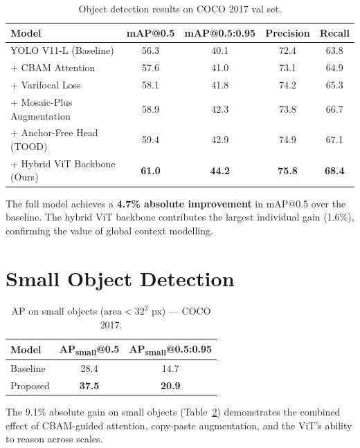 \documentclass[12pt, a4paper]{report}
\begin{document}
\begin{table}[H]
  \centering
  \caption{Object detection results on COCO 2017 val set.}
  \label{tab:coco-results}
  \begin{tabular}{lcccc}
    \toprule
    \textbf{Model} & \textbf{mAP@0.5} & \textbf{mAP@0.5:0.95} 
                   & \textbf{Precision} & \textbf{Recall} \\
    \midrule
    YOLO V11-L (Baseline)         & 56.3 & 40.1 & 72.4 & 63.8 \\
    + CBAM Attention               & 57.6 & 41.0 & 73.1 & 64.9 \\
    + Varifocal Loss               & 58.1 & 41.8 & 74.2 & 65.3 \\
    + Mosaic-Plus Augmentation     & 58.9 & 42.3 & 73.8 & 66.7 \\
    + Anchor-Free Head (TOOD)      & 59.4 & 42.9 & 74.9 & 67.1 \\
    + Hybrid ViT Backbone (Ours)   & \textbf{61.0} & \textbf{44.2} 
                                   & \textbf{75.8} & \textbf{68.4} \\
    \bottomrule
  \end{tabular}
\end{table}

The full model achieves a \textbf{4.7\% absolute improvement} in mAP@0.5 
over the baseline. The hybrid ViT backbone contributes the largest individual 
gain (1.6\%), confirming the value of global context modelling.

\section{Small Object Detection}

\begin{table}[H]
  \centering
  \caption{AP on small objects ($\text{area} < 32^2$ px) — COCO 2017.}
  \label{tab:small-obj}
  \begin{tabular}{lcc}
    \toprule
    \textbf{Model} & \textbf{AP\textsubscript{small}@0.5} 
                   & \textbf{AP\textsubscript{small}@0.5:0.95} \\
    \midrule
    Baseline      & 28.4 & 14.7 \\
    Proposed      & \textbf{37.5} & \textbf{20.9} \\
    \bottomrule
  \end{tabular}
\end{table}

The 9.1\% absolute gain on small objects (Table~\ref{tab:small-obj}) 
demonstrates the combined effect of CBAM-guided attention, copy-paste 
augmentation, and the ViT's ability to reason across scales.
\end{document}
